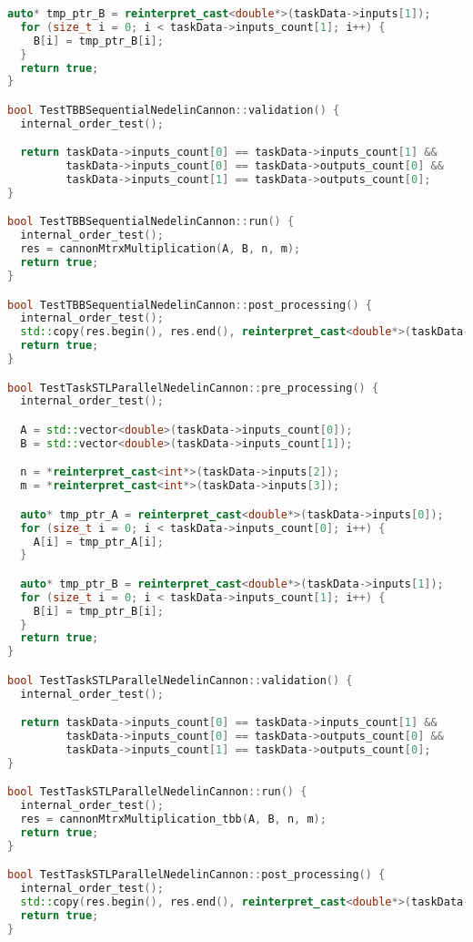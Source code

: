 \documentclass{report}
\begin{document}
\begin{lstlisting}[language=C++,caption=STL версия]
  auto* tmp_ptr_B = reinterpret_cast<double*>(taskData->inputs[1]);
  for (size_t i = 0; i < taskData->inputs_count[1]; i++) {
    B[i] = tmp_ptr_B[i];
  }
  return true;
}

bool TestTBBSequentialNedelinCannon::validation() {
  internal_order_test();

  return taskData->inputs_count[0] == taskData->inputs_count[1] &&
         taskData->inputs_count[0] == taskData->outputs_count[0] &&
         taskData->inputs_count[1] == taskData->outputs_count[0];
}

bool TestTBBSequentialNedelinCannon::run() {
  internal_order_test();
  res = cannonMtrxMultiplication(A, B, n, m);
  return true;
}

bool TestTBBSequentialNedelinCannon::post_processing() {
  internal_order_test();
  std::copy(res.begin(), res.end(), reinterpret_cast<double*>(taskData->outputs[0]));
  return true;
}

bool TestTaskSTLParallelNedelinCannon::pre_processing() {
  internal_order_test();

  A = std::vector<double>(taskData->inputs_count[0]);
  B = std::vector<double>(taskData->inputs_count[1]);

  n = *reinterpret_cast<int*>(taskData->inputs[2]);
  m = *reinterpret_cast<int*>(taskData->inputs[3]);

  auto* tmp_ptr_A = reinterpret_cast<double*>(taskData->inputs[0]);
  for (size_t i = 0; i < taskData->inputs_count[0]; i++) {
    A[i] = tmp_ptr_A[i];
  }

  auto* tmp_ptr_B = reinterpret_cast<double*>(taskData->inputs[1]);
  for (size_t i = 0; i < taskData->inputs_count[1]; i++) {
    B[i] = tmp_ptr_B[i];
  }
  return true;
}

bool TestTaskSTLParallelNedelinCannon::validation() {
  internal_order_test();

  return taskData->inputs_count[0] == taskData->inputs_count[1] &&
         taskData->inputs_count[0] == taskData->outputs_count[0] &&
         taskData->inputs_count[1] == taskData->outputs_count[0];
}

bool TestTaskSTLParallelNedelinCannon::run() {
  internal_order_test();
  res = cannonMtrxMultiplication_tbb(A, B, n, m);
  return true;
}

bool TestTaskSTLParallelNedelinCannon::post_processing() {
  internal_order_test();
  std::copy(res.begin(), res.end(), reinterpret_cast<double*>(taskData->outputs[0]));
  return true;
}
\end{lstlisting}
\end{document}
